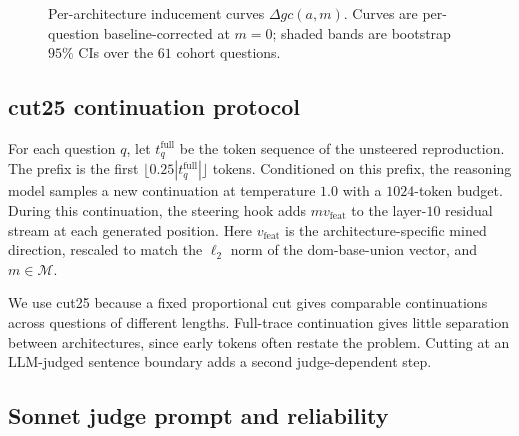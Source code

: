 \begin{figure}[t]
    \centering
    \caption{Per-architecture inducement curves $\Delta gc(a, m)$. Curves are per-question baseline-corrected at $m=0$; shaded bands are bootstrap $95\%$ CIs over the $61$ cohort questions.}
    \label{fig:c7-inducement-app}
\end{figure}

\subsection{cut25 continuation protocol}
\label{app:c7-cut25}

For each question $q$, let $t_q^{\text{full}}$ be the token sequence of the unsteered reproduction. The prefix is the first $\lfloor 0.25 |t_q^{\text{full}}| \rfloor$ tokens. Conditioned on this prefix, the reasoning model samples a new continuation at temperature $1.0$ with a $1024$-token budget. During this continuation, the steering hook adds $m v_{\text{feat}}$ to the layer-$10$ residual stream at each generated position. Here $v_{\text{feat}}$ is the architecture-specific mined direction, rescaled to match the $\ell_2$ norm of the dom-base-union vector, and $m \in \mathcal{M}$.

We use cut25 because a fixed proportional cut gives comparable continuations across questions of different lengths. Full-trace continuation gives little separation between architectures, since early tokens often restate the problem. Cutting at an LLM-judged sentence boundary adds a second judge-dependent step.

\subsection{Sonnet judge prompt and reliability}
\label{app:c7-judge}

